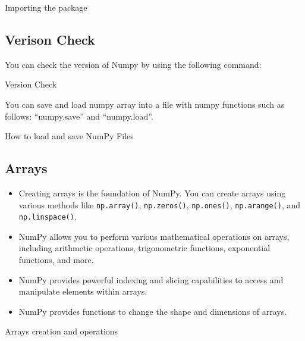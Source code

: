 \begin{code}[h!]
	    
	
	\caption{Importing the package}
	
\end{code}

\subsection{Verison Check}
You can check the version of Numpy by using the following command:

\begin{code}[h!]
	    
	\caption{Version Check}
\end{code}

You can save and load numpy array into a file with numpy functions such as follows: “numpy.save” and “numpy.load”.

\begin{code}[h!]
	    
	\caption{How to load and save NumPy Files}
\end{code}

\subsection{Arrays}

\begin{itemize}
	\item Creating arrays is the foundation of NumPy. You can create arrays using various methods like \texttt{np.array()}, \texttt{np.zeros()}, \texttt{np.ones()}, \texttt{np.arange()}, and \texttt{np.linspace()}.
	\item NumPy allows you to perform various mathematical operations on arrays, including arithmetic operations, trigonometric functions, exponential functions, and more.
	\item NumPy provides powerful indexing and slicing capabilities to access and manipulate elements within arrays.
	\item NumPy provides functions to change the shape and dimensions of arrays.
\end{itemize}

\begin{code}[h!]
	    
	
	\caption{Arrays creation and operations}
	
\end{code}

